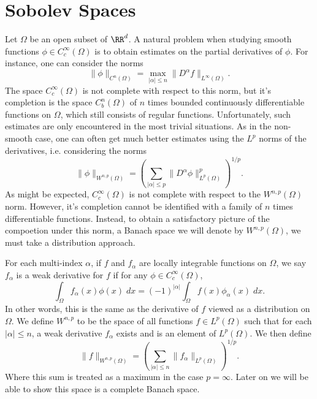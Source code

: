 \chapter{Sobolev Spaces}

Let $\Omega$ be an open subset of $\RR^d$. A natural problem when studying smooth functions $\phi \in C_c^\infty(\Omega)$ is to obtain estimates on the partial derivatives of $\phi$. For instance, one can consider the norms
%
\[ \| \phi \|_{C^n(\Omega)} = \max_{|\alpha| \leq n} \| D^\alpha f \|_{L^\infty(\Omega)}. \]
%
The space $C_c^\infty(\Omega)$ is not complete with respect to this norm, but it's completion is the space $C^n_b(\Omega)$ of $n$ times bounded continuously differentiable functions on $\Omega$, which still consists of regular functions. Unfortunately, such estimates are only encountered in the most trivial situations. As in the non-smooth case, one can often get much better estimates using the $L^p$ norms of the derivatives, i.e. considering the norms
%
\[ \| \phi \|_{W^{n,p}(\Omega)} = \left( \sum_{|\alpha| \leq p} \| D^\alpha \phi \|_{L^p(\Omega)}^p \right)^{1/p}. \]
%
As might be expected, $C_c^\infty(\Omega)$ is not complete with respect to the $W^{n,p}(\Omega)$ norm. However, it's completion cannot be identified with a family of $n$ times differentiable functions. Instead, to obtain a satisfactory picture of the compoetion under this norm, a Banach space we will denote by $W^{n,p}(\Omega)$, we must take a distribution approach.

For each multi-index $\alpha$, if $f$ and $f_\alpha$ are locally integrable functions on $\Omega$, we say $f_\alpha$ is a weak derivative for $f$ if for any $\phi \in C_c^\infty(\Omega)$,
%
\[ \int_\Omega f_\alpha(x) \phi(x)\; dx = (-1)^{|\alpha|} \int_\Omega f(x) \phi_\alpha(x)\; dx. \]
%
In other words, this is the same as the derivative of $f$ viewed as a distribution on $\Omega$. We define $W^{n,p}$ to be the space of all functions $f \in L^p(\Omega)$ such that for each $|\alpha| \leq n$, a weak derivative $f_\alpha$ exists and is an element of $L^p(\Omega)$. We then define
%
\[ \| f \|_{W^{n,p}(\Omega)} = \left( \sum_{|\alpha| \leq n} \| f_\alpha \|_{L^p(\Omega)} \right)^{1/p}. \]
%
Where this sum is treated as a maximum in the case $p = \infty$. Later on we will be able to show this space is a complete Banach space.

